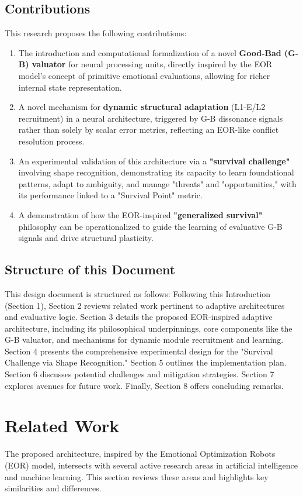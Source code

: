 \documentclass{article}
\begin{document}
\subsection{Contributions}
This research proposes the following contributions:
\begin{enumerate}
    \item The introduction and computational formalization of a novel \textbf{Good-Bad (G-B) valuator} for neural processing units, directly inspired by the EOR model's concept of primitive emotional evaluations, allowing for richer internal state representation.
    \item A novel mechanism for \textbf{dynamic structural adaptation} (L1-E/L2 recruitment) in a neural architecture, triggered by G-B dissonance signals rather than solely by scalar error metrics, reflecting an EOR-like conflict resolution process.
    \item An experimental validation of this architecture via a \textbf{"survival challenge"} involving shape recognition, demonstrating its capacity to learn foundational patterns, adapt to ambiguity, and manage "threats" and "opportunities," with its performance linked to a "Survival Point" metric.
    \item A demonstration of how the EOR-inspired \textbf{"generalized survival"} philosophy can be operationalized to guide the learning of evaluative G-B signals and drive structural plasticity.
\end{enumerate}

\subsection{Structure of this Document}
This design document is structured as follows: Following this Introduction (Section 1), Section 2 reviews related work pertinent to adaptive architectures and evaluative logic. Section 3 details the proposed EOR-inspired adaptive architecture, including its philosophical underpinnings, core components like the G-B valuator, and mechanisms for dynamic module recruitment and learning. Section 4 presents the comprehensive experimental design for the "Survival Challenge via Shape Recognition." Section 5 outlines the implementation plan. Section 6 discusses potential challenges and mitigation strategies. Section 7 explores avenues for future work. Finally, Section 8 offers concluding remarks.

\section{Related Work}
The proposed architecture, inspired by the Emotional Optimization Robots (EOR) model, intersects with several active research areas in artificial intelligence and machine learning. This section reviews these areas and highlights key similarities and differences.
\end{document}
